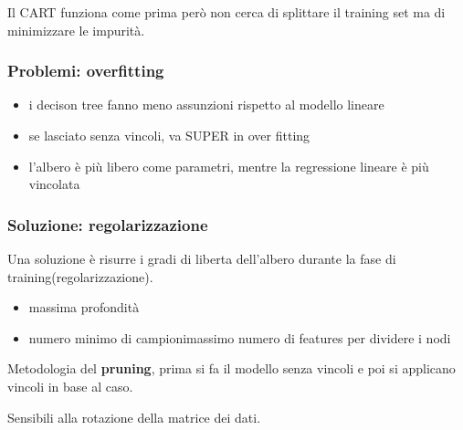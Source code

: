 Il CART funziona come prima però non cerca di splittare il
training set ma di minimizzare le impurità.

\subsubsection{Problemi: overfitting}
\begin{itemize}
    \item i decison tree fanno meno assunzioni rispetto al modello lineare
    \item se lasciato senza vincoli, va SUPER in over fitting
    \item l'albero è più libero come parametri, mentre la regressione lineare è
    più vincolata
\end{itemize}

\subsubsection{Soluzione: regolarizzazione}
Una soluzione è risurre i gradi di liberta dell'albero durante la fase di
training(regolarizzazione).
\begin{itemize}
    \item massima profondità
    \item numero minimo di campionimassimo numero di features per dividere i nodi
\end{itemize}

Metodologia del \textbf{pruning}, prima si fa il modello senza vincoli e poi si
applicano vincoli in base al caso.



Sensibili alla rotazione della matrice dei dati.
